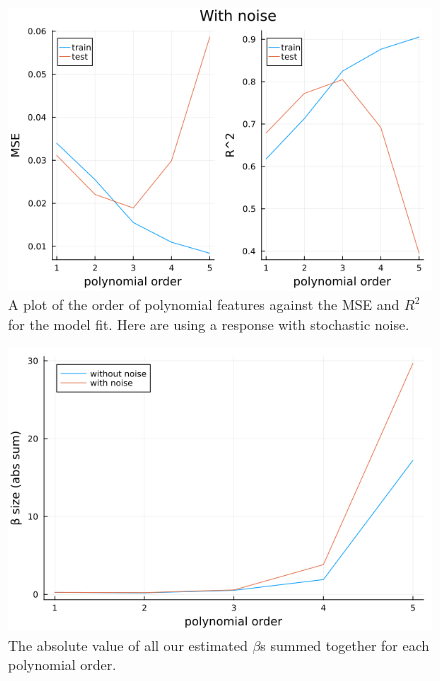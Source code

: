 \documentclass{article}
\begin{document}
\begin{figure}
    \centerline{\includegraphics[scale=0.5]{linearregression_with_noise}}
    \caption{A plot of the order of polynomial features against the MSE and $R^2$ for the model fit. Here are using a response with stochastic noise.}
    \label{linearregression-with-noise}
\end{figure}

\begin{figure}
    \centerline{\includegraphics[scale=0.5]{linearregression_beta_size}}
    \caption{The absolute value of all our estimated $\beta$s summed together for each polynomial order.}
    \label{beta-abs-sum}
\end{figure}
\end{document}
